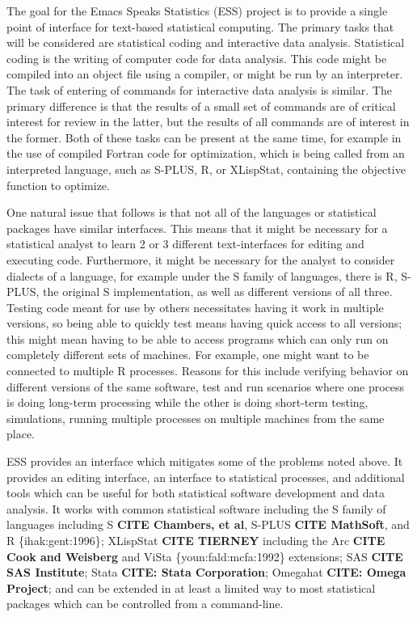 \documentclass{article}
\newcommand{\citep}[1]{{\{\sf#1\}}}
\begin{document}
The goal for the Emacs Speaks Statistics (ESS) project is to provide a
single point of interface for text-based statistical computing.  The
primary tasks that will be considered are statistical coding and
interactive data analysis.  Statistical coding is the writing of
computer code for data analysis.  This code might be compiled into an
object file using a compiler, or might be run by an interpreter.  The
task of entering of commands for interactive data analysis is similar.
The primary difference is that the results of a small set of commands
are of critical interest for review in the latter, but the results of
all commands are of interest in the former.  Both of these tasks can
be present at the same time, for example in the use of compiled
Fortran code for optimization, which is being called from an
interpreted language, such as S-PLUS, R, or XLispStat, containing the
objective function to optimize.

One natural issue that follows is that not all of the languages or
statistical packages have similar interfaces.  This means that it
might be necessary for a statistical analyst to learn 2 or 3 different
text-interfaces for editing and executing code.  Furthermore, it might
be necessary for the analyst to consider dialects of a language, for
example under the S family of languages, there is R, S-PLUS, the
original S implementation, as well as different versions of all three.
Testing code meant for use by others necessitates having it work in
multiple versions, so being able to quickly test means having quick
access to all versions; this might mean having to be able to access
programs which can only run on completely different sets of machines.
For example, one might want to be connected to multiple R processes.
Reasons for this include verifying behavior on different versions of
the same software, test and run scenarios where one process is doing
long-term processing while the other is doing short-term testing,
simulations, running multiple processes on multiple machines from the
same place.

ESS provides an interface which mitigates some of the problems noted
above.  It provides an editing interface, an interface to statistical
processes, and additional tools which can be useful for both
statistical software development and data analysis.  It works with
common statistical software including the S family of languages
including S \textbf{CITE Chambers, et al}, S-PLUS \textbf{CITE
  MathSoft}, and R \citep{ihak:gent:1996}; XLispStat \textbf{CITE
  TIERNEY} including the Arc \textbf{CITE Cook and Weisberg} and
ViSta \citep{youn:fald:mcfa:1992} extensions; SAS \textbf{CITE
  SAS Institute}; Stata \textbf{CITE: Stata Corporation}; Omegahat
\textbf{CITE: Omega Project}; and can be extended in at least a
limited way to most statistical packages which can be controlled from
a command-line.
\end{document}
